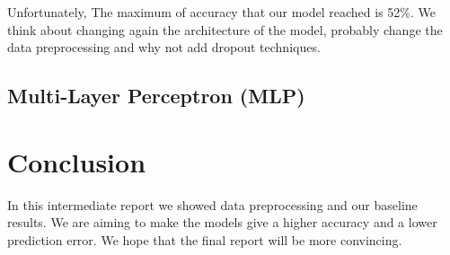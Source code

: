 \documentclass[a4paper,english,12pt]{article}
\begin{document}
Unfortunately, The maximum of accuracy that our model reached is 52\%. We think about changing again the architecture of the model, probably change the data preprocessing and why not add dropout techniques.

\subsection{Multi-Layer Perceptron (MLP)}


\section{Conclusion}
In this intermediate report we showed data preprocessing and our baseline results. We are aiming to make the models give a higher accuracy and a lower prediction error. We hope that the final report will be more convincing.  
\end{document}
